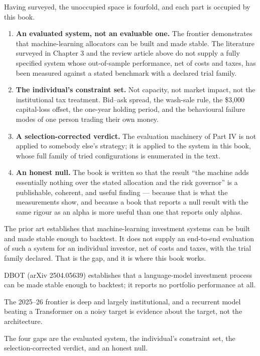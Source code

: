 Having surveyed, the unoccupied space is fourfold, and each part is
occupied by this book.

\begin{enumerate}
\item \textbf{An evaluated system, not an evaluable one.} The frontier
demonstrates that machine-learning allocators can be built and made stable.
The literature surveyed in Chapter 3 and the review article above do not
supply a fully specified system whose out-of-sample performance, net of
costs and taxes, has been measured against a stated benchmark with a
declared trial family.
\item \textbf{The individual's constraint set.} Not capacity, not market
impact, not the institutional tax treatment. Bid--ask spread, the wash-sale
rule, the \$3,000 capital-loss offset, the one-year holding period, and the
behavioural failure modes of one person trading their own money.
\item \textbf{A selection-corrected verdict.} The evaluation machinery of
Part IV is not applied to somebody else's strategy; it is applied to the
system in this book, whose full family of tried configurations is
enumerated in the text.
\item \textbf{An honest null.} The book is written so that the result
``the machine adds essentially nothing over the stated allocation and the
risk governor'' is a publishable, coherent, and useful finding --- because
that is what the measurements show, and because a book that reports a null
result with the same rigour as an alpha is more useful than one that
reports only alphas.
\end{enumerate}

\begin{takeaway}
The prior art establishes that machine-learning investment systems can be
built and made stable enough to backtest. It does not supply an end-to-end
evaluation of such a system for an individual investor, net of costs and
taxes, with the trial family declared. That is the gap, and it is where
this book works.
\end{takeaway}

\begin{keytakeaways}
\item DBOT (arXiv 2504.05639) establishes that a language-model investment
process can be made stable enough to backtest; it reports no portfolio
performance at all.
\item The 2025--26 frontier is deep and largely institutional, and a
recurrent model beating a Transformer on a noisy target is evidence about
the target, not the architecture.
\item The four gaps are the evaluated system, the individual's constraint
set, the selection-corrected verdict, and an honest null.
\end{keytakeaways}
